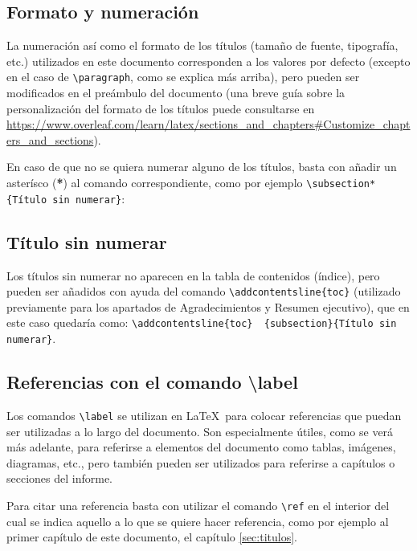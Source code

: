 \documentclass[a4paper, 11pt, spanish, twoside]{article}
\begin{document}
\subsection{Formato y numeración}

La numeración así como el formato de los títulos (tamaño de fuente, tipografía, etc.) utilizados en este documento corresponden a los valores por defecto (excepto en el caso de \texttt{\textbackslash paragraph}, como se explica más arriba), pero pueden ser modificados en el preámbulo del documento (una breve guía sobre la personalización del formato de los títulos puede consultarse en \url{https://www.overleaf.com/learn/latex/sections_and_chapters#Customize_chapters_and_sections}). 

En caso de que no se quiera numerar alguno de los títulos, basta con añadir un asterísco (\textbf{*}) al comando correspondiente, como por ejemplo \texttt{\textbackslash subsection*\{Título sin numerar\}}:


\subsection*{Título sin numerar} 

Los títulos sin numerar no aparecen en la tabla de contenidos (índice), pero pueden ser añadidos con ayuda del comando \texttt{\textbackslash addcontentsline\{toc\}} (utilizado previamente para los apartados de Agradecimientos y Resumen ejecutivo), que en este caso quedaría como: \texttt{\textbackslash addcontentsline\{toc\} \ \{subsection\}\{Título sin numerar\}}.


\subsection{Referencias con el comando \text\textbackslash label} \label{sec:referencias}

Los comandos \texttt{\textbackslash label} se utilizan en \LaTeX \ para colocar referencias que puedan ser utilizadas a lo largo del documento. Son especialmente útiles, como se verá más adelante, para referirse a elementos del documento como tablas, imágenes, diagramas, etc., pero también pueden ser utilizados para referirse a capítulos o secciones del informe. 

Para citar una referencia basta con utilizar el comando \texttt{\textbackslash ref} en el interior del cual se indica aquello a lo que se quiere hacer referencia, como por ejemplo al primer capítulo de este documento, el capítulo \ref{sec:titulos}.
\end{document}

